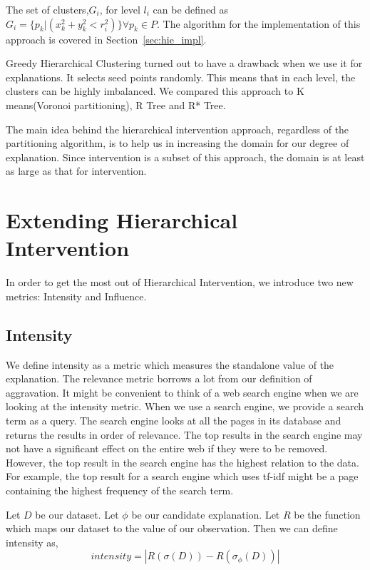 The set of clusters,$G_i$, for level $l_i$ can be defined as $G_i=\{p_k|(x_k^2 + y_k^2 < r_i^2)\}\forall p_k \in P$. The algorithm for the implementation of this approach is covered in Section~\ref{sec:hie_impl}.

Greedy Hierarchical Clustering turned out to have a drawback when we use it for explanations. It selects seed points randomly. This means that in each level, the clusters can be highly imbalanced. We compared this approach to K means(Voronoi partitioning)\citep{hartigan1979algorithm,aurenhammer2000voronoi}, R Tree\citep{guttman1984r} and R* Tree\citep{beckmann1990r}.

The main idea behind the hierarchical intervention approach, regardless of the partitioning algorithm, is to help us in increasing the domain for our degree of explanation. Since intervention is a subset of this approach, the domain is at least as large as that for intervention.


\section{Extending Hierarchical Intervention}
\label{sec:extending_hi}

In order to get the most out of Hierarchical Intervention, we introduce two new metrics: Intensity and Influence.

\subsection{Intensity}
\label{sec:intensity}

We define intensity as a metric which measures the standalone value of the explanation. The relevance metric borrows a lot from our definition of aggravation. It might be convenient to think of a web search engine when we are looking at the intensity metric. When we use a search engine, we provide a search term as a query. The search engine looks at all the pages in its database and returns the results in order of relevance. The top results in the search engine may not have a significant effect on the entire web if they were to be removed. However, the top result in the search engine has the highest relation to the data. For example, the top result for a search engine which uses tf-idf might be a page containing the highest frequency of the search term\citep{robertson2004understanding}.

Let $D$ be our dataset. Let $\phi$ be our candidate explanation. Let $R$ be the function which maps our dataset to the value of our observation. Then we can define intensity as,
$$intensity = |R(\sigma (D)) - R(\sigma_\phi (D))|$$

